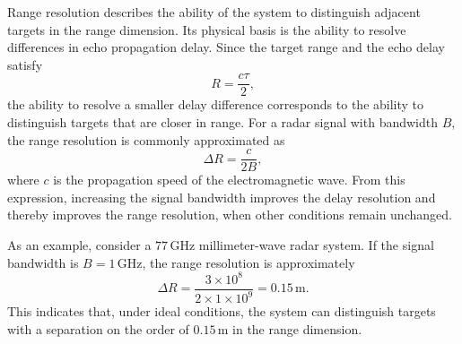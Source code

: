 Range resolution describes the ability of the system to distinguish adjacent
targets in the range dimension.
Its physical basis is the ability to resolve differences in echo propagation
delay.
Since the target range and the echo delay satisfy
\begin{equation}
    R=\frac{c\tau}{2},
    \label{eq:range_delay_resolution}
\end{equation}
the ability to resolve a smaller delay difference corresponds to the ability
to distinguish targets that are closer in range.
For a radar signal with bandwidth \(B\), the range resolution is commonly
approximated as
\begin{equation}
    \Delta R=\frac{c}{2B},
    \label{eq:range_resolution}
\end{equation}
where \(c\) is the propagation speed of the electromagnetic wave.
From this expression, increasing the signal bandwidth improves the delay
resolution and thereby improves the range resolution, when other conditions
remain unchanged.

As an example, consider a \(77\,\mathrm{GHz}\) millimeter-wave radar system.
If the signal bandwidth is \(B=1\,\mathrm{GHz}\), the range resolution is
approximately
\begin{equation}
    \Delta R
    =
    \frac{3\times 10^8}{2\times 1\times 10^9}
    =
    0.15\,\mathrm{m}.
    \label{eq:range_resolution_example}
\end{equation}
This indicates that, under ideal conditions, the system can distinguish
targets with a separation on the order of \(0.15\,\mathrm{m}\) in the range
dimension.

